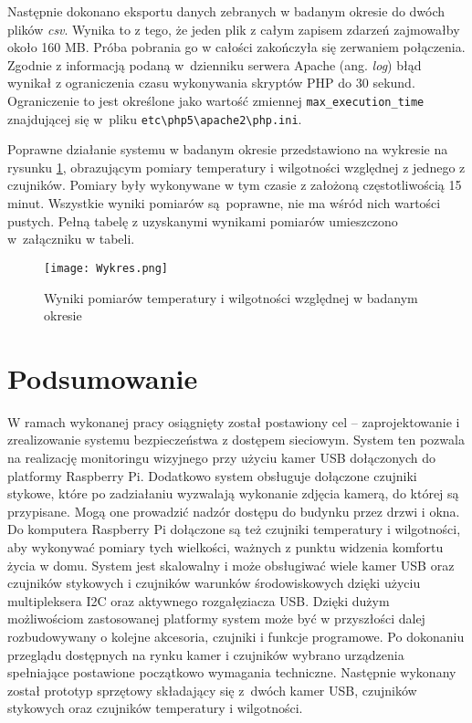 \documentclass[a4paper,11pt,twoside]{article}
\begin{document}
Następnie dokonano eksportu danych zebranych w badanym okresie do dwóch plików \textit{csv}. Wynika to z tego, że jeden plik z całym zapisem zdarzeń zajmowałby około 160 MB. Próba pobrania go w całości zakończyła się zerwaniem połączenia. Zgodnie z informacją podaną w~dzienniku serwera Apache (ang. \textit{log}) błąd wynikał z ograniczenia czasu wykonywania skryptów PHP do 30 sekund. Ograniczenie to jest określone jako wartość zmiennej \linebreak\texttt{max{\_}execution{\_}time} znajdującej się w~pliku \texttt{etc{\textbackslash}php5{\textbackslash}apache2{\textbackslash}php.ini}. 

Poprawne działanie systemu w badanym okresie przedstawiono na wykresie na rysunku \ref{fig: test_pomiary}, obrazującym pomiary temperatury i wilgotności względnej z jednego z czujników. Pomiary były wykonywane w tym czasie z założoną częstotliwością 15 minut. Wszystkie wyniki pomiarów są~poprawne, nie ma wśród nich wartości pustych. Pełną tabelę z uzyskanymi wynikami pomiarów umieszczono w~załączniku w tabeli.

\begin{figure}[H]
\begin{center}
\texttt{[image: Wykres.png]}
\caption{Wyniki pomiarów temperatury i wilgotności względnej w badanym okresie}
\label{fig: test_pomiary}
\end{center}
\end{figure}


\newpage
\section{Podsumowanie}
W ramach wykonanej pracy osiągnięty został postawiony cel -- zaprojektowanie i zrealizowanie systemu bezpieczeństwa z dostępem sieciowym. System ten pozwala na realizację monitoringu wizyjnego przy użyciu kamer USB dołączonych do platformy Raspberry Pi. Dodatkowo system obsługuje dołączone czujniki stykowe, które po zadziałaniu wyzwalają wykonanie zdjęcia kamerą, do której są przypisane. Mogą one prowadzić nadzór dostępu do budynku przez drzwi i okna. Do komputera Raspberry Pi dołączone są też czujniki temperatury i wilgotności, aby wykonywać pomiary tych wielkości, ważnych z punktu widzenia komfortu życia w domu. System jest skalowalny i może obsługiwać wiele kamer USB oraz czujników stykowych i czujników warunków środowiskowych dzięki użyciu multipleksera I2C oraz aktywnego rozgałęziacza USB. Dzięki dużym możliwościom zastosowanej platformy system może być w przyszłości dalej rozbudowywany o kolejne akcesoria, czujniki i funkcje programowe. Po dokonaniu przeglądu dostępnych na rynku kamer i czujników wybrano urządzenia spełniające postawione początkowo wymagania techniczne. Następnie wykonany został prototyp sprzętowy składający się z~dwóch kamer USB, czujników stykowych oraz czujników temperatury i wilgotności.
\end{document}
